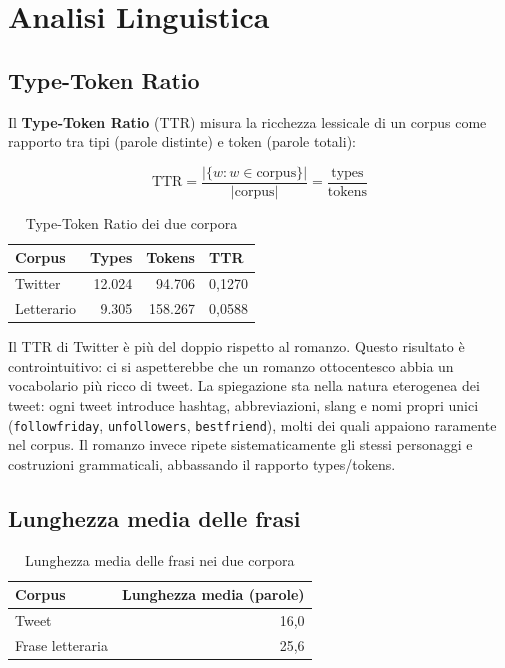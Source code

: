\documentclass[12pt, a4paper]{article}
\begin{document}
\section{Analisi Linguistica}

\subsection{Type-Token Ratio}

Il \textbf{Type-Token Ratio} (TTR) misura la ricchezza lessicale
di un corpus come rapporto tra tipi (parole distinte) e token
(parole totali):

\begin{equation}
\text{TTR} =
\frac{|\{w : w \in \text{corpus}\}|}{|\text{corpus}|}
= \frac{\text{types}}{\text{tokens}}
\end{equation}

\begin{table}[H]
\centering
\begin{tabular}{lrrl}
\toprule
\textbf{Corpus} & \textbf{Types} & \textbf{Tokens} & \textbf{TTR} \\
\midrule
Twitter    & 12.024 & 94.706  & 0,1270 \\
Letterario & 9.305  & 158.267 & 0,0588 \\
\bottomrule
\end{tabular}
\caption{Type-Token Ratio dei due corpora}
\end{table}

Il TTR di Twitter è più del doppio rispetto al romanzo.
Questo risultato è controintuitivo: ci si aspetterebbe che un romanzo
ottocentesco abbia un vocabolario più ricco di tweet. La spiegazione
sta nella natura eterogenea dei tweet: ogni tweet introduce hashtag,
abbreviazioni, slang e nomi propri unici (\texttt{followfriday},
\texttt{unfollowers}, \texttt{bestfriend}), molti dei quali appaiono
raramente nel corpus. Il romanzo invece ripete sistematicamente gli
stessi personaggi e costruzioni grammaticali, abbassando il rapporto
types/tokens.

\subsection{Lunghezza media delle frasi}

\begin{table}[H]
\centering
\begin{tabular}{lr}
\toprule
\textbf{Corpus} & \textbf{Lunghezza media (parole)} \\
\midrule
Tweet             & 16,0 \\
Frase letteraria  & 25,6 \\
\bottomrule
\end{tabular}
\caption{Lunghezza media delle frasi nei due corpora}
\end{table}
\end{document}
